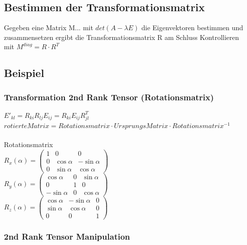 \documentclass[a4paper]{scrartcl}
\begin{document}
\subsection{Bestimmen der Transformationsmatrix}

Gegeben eine Matrix M... mit $det(A-\lambda E)$ die Eigenvektoren bestimmen und zusammensetzen ergibt die Transformationsmatrix R am Schluss Kontrollieren mit $M^{diag}=R \cdot R^T$



\subsection{Beispiel}
\subsubsection{Transformation 2nd Rank Tensor (Rotationsmatrix)}
$E'_{kl}=R_{ki}R_{lj}E_{ij}=R_{ki}E_{ij}R_{jl}^T$\\
$rotierteMatrix = Rotationsmatrix \cdot UrsprungsMatrix \cdot
Rotationsmatrix^{-1}$
\\
\\
Rotationsmatrix
\\
$R_x(\alpha) = \begin{pmatrix} 
1 &   0         & 0           \\
0 & \cos \alpha & -\sin \alpha \\
0 & \sin \alpha &  \cos \alpha
\end{pmatrix} $
\\
$R_y(\alpha) = \begin{pmatrix} 
\cos \alpha  & 0 & \sin \alpha \\
   0         & 1 &  0          \\
-\sin \alpha & 0 & \cos \alpha
\end{pmatrix} $
\\
$R_z(\alpha) = \begin{pmatrix} 
\cos \alpha & -\sin \alpha & 0 \\
\sin \alpha &  \cos \alpha & 0 \\            
   0        &  0           & 1
\end{pmatrix}$
\\

\subsubsection{2nd Rank Tensor Manipulation}
\end{document}
